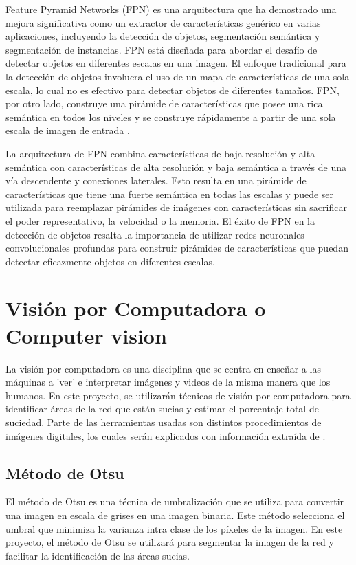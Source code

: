 Feature Pyramid Networks (FPN) es una arquitectura que ha demostrado una mejora significativa como un extractor de características genérico en varias aplicaciones, incluyendo la detección de objetos, segmentación semántica y segmentación de instancias. FPN está diseñada para abordar el desafío de detectar objetos en diferentes escalas en una imagen. El enfoque tradicional para la detección de objetos involucra el uso de un mapa de características de una sola escala, lo cual no es efectivo para detectar objetos de diferentes tamaños. FPN, por otro lado, construye una pirámide de características que posee una rica semántica en todos los niveles y se construye rápidamente a partir de una sola escala de imagen de entrada \cite{cite:Tsung}.

La arquitectura de FPN combina características de baja resolución y alta semántica con características de alta resolución y baja semántica a través de una vía descendente y conexiones laterales. Esto resulta en una pirámide de características que tiene una fuerte semántica en todas las escalas y puede ser utilizada para reemplazar pirámides de imágenes con características sin sacrificar el poder representativo, la velocidad o la memoria. El éxito de FPN en la detección de objetos resalta la importancia de utilizar redes neuronales convolucionales profundas para construir pirámides de características que puedan detectar eficazmente objetos en diferentes escalas.


\section{Visión por Computadora o Computer vision}

La visión por computadora es una disciplina que se centra en enseñar a las máquinas a 'ver' e interpretar imágenes y videos de la misma manera que los humanos. En este proyecto, se utilizarán técnicas de visión por computadora para identificar áreas de la red que están sucias y estimar el porcentaje total de suciedad. Parte de las herramientas usadas son distintos procedimientos de imágenes digitales, los cuales serán explicados con información extraída de \cite{cite:Gonzalez}.

\subsection{Método de Otsu}

El método de Otsu es una técnica de umbralización que se utiliza para convertir una imagen en escala de grises en una imagen binaria. Este método selecciona el umbral que minimiza la varianza intra clase de los píxeles de la imagen. En este proyecto, el método de Otsu se utilizará para segmentar la imagen de la red y facilitar la identificación de las áreas sucias.

